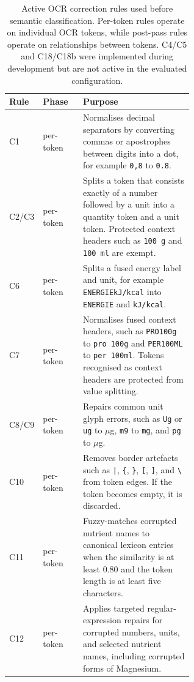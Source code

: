 \begin{table}[ht]
  \centering
  \caption[OCR correction rules]{Active OCR correction rules used before semantic classification. Per-token rules operate on individual OCR tokens, while post-pass rules operate on relationships between tokens. C4/C5 and C18/C18b were implemented during development but are not active in the evaluated configuration.}
  \label{tab:correction-rules}
  \small
  \begin{tabular}{@{}llp{0.60\linewidth}@{}}
    \toprule
    \textbf{Rule} & \textbf{Phase} & \textbf{Purpose} \\
    \midrule
    C1 & per-token & Normalises decimal separators by converting commas or apostrophes between digits into a dot, for example \texttt{0,8} to \texttt{0.8}. \\

    C2/C3 & per-token & Splits a token that consists exactly of a number followed by a unit into a quantity token and a unit token. Protected context headers such as \texttt{100 g} and \texttt{100 ml} are exempt. \\

    C6 & per-token & Splits a fused energy label and unit, for example \texttt{ENERGIEkJ/kcal} into \texttt{ENERGIE} and \texttt{kJ/kcal}. \\

    C7 & per-token & Normalises fused context headers, such as \texttt{PRO100g} to \texttt{pro 100g} and \texttt{PER100ML} to \texttt{per 100ml}. Tokens recognised as context headers are protected from value splitting. \\

    C8/C9 & per-token & Repairs common unit glyph errors, such as \texttt{Ug} or \texttt{ug} to $\mu$g, \texttt{m9} to \texttt{mg}, and \texttt{pg} to $\mu$g. \\

    C10 & per-token & Removes border artefacts such as \texttt{|}, \texttt{\{}, \texttt{\}}, \texttt{[}, \texttt{]}, and \texttt{\textbackslash} from token edges. If the token becomes empty, it is discarded. \\

    C11 & per-token & Fuzzy-matches corrupted nutrient names to canonical lexicon entries when the similarity is at least \(0.80\) and the token length is at least five characters. \\

    C12 & per-token & Applies targeted regular-expression repairs for corrupted numbers, units, and selected nutrient names, including corrupted forms of Magnesium. \\


\end{tabular}
\end{table}
